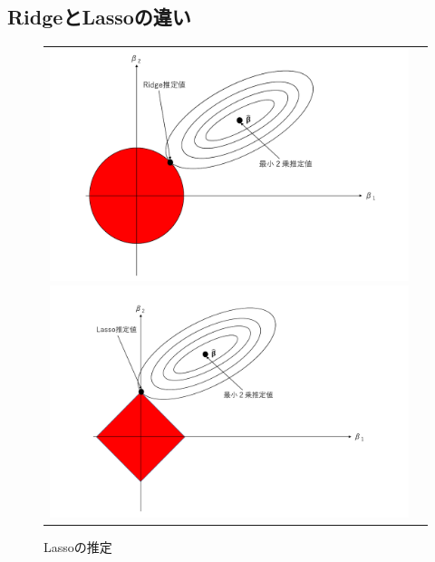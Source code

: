 \documentclass[dvipdfmx, 10pt]{beamer}
\begin{document}
\subsection{RidgeとLassoの違い}
\begin{frame}{\insertsubsection}
    \begin{figure}[Ht]
            \begin{tabular}{cc}
            	 \begin{minipage}{0.4\hsize}
                   	 \includegraphics[width=1.0\linewidth]{../img/ridge.pdf}
            		 \caption{Ridgeの推定}
            		 \label{fig:ridge}
            	\end{minipage}
	 	\begin{minipage}{0.4\hsize}
                            \includegraphics[width=1.0\linewidth]{../img/lasso.pdf}
            		 \caption{Lassoの推定}
            		 \label{fig:lasso}
            	\end{minipage}

\end{tabular}
\end{figure}
\end{frame}
\end{document}
